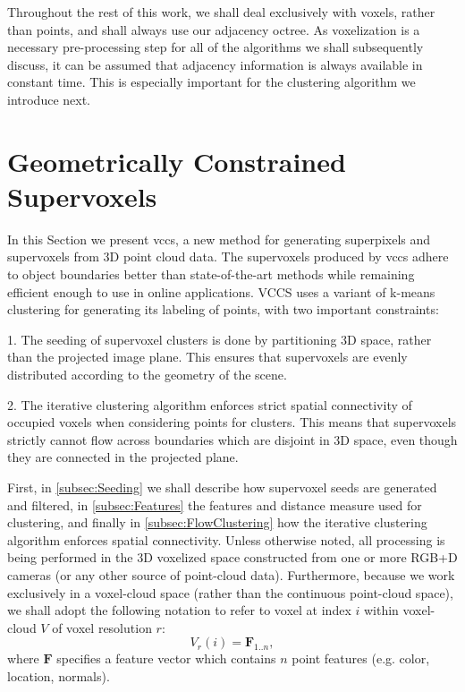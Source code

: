 Throughout the rest of this work, we shall deal exclusively with voxels, rather than points, and shall always use our adjacency octree. As voxelization is a necessary pre-processing step for all of the algorithms we shall subsequently discuss, it can be assumed that adjacency information is always available in constant time. This is especially important for the clustering algorithm we introduce next.

\section{Geometrically Constrained Supervoxels}
\label{sec:Supervoxels}
In this Section we present  \acrfull{vccs}, a new method for generating superpixels and supervoxels from 3D point cloud data. The supervoxels produced by \gls{vccs} adhere to object boundaries better than state-of-the-art methods while remaining efficient enough to use in online applications. VCCS uses a variant of k-means clustering for generating its labeling of points, with two important constraints:

1. The seeding of supervoxel clusters is done by partitioning 3D space, rather than the projected image plane. This ensures that supervoxels are evenly distributed according to the geometry of the scene.

2. The iterative clustering algorithm enforces strict spatial connectivity of occupied voxels when considering points for clusters. This means that supervoxels strictly cannot flow across boundaries which are disjoint in 3D space, even though they are connected in the projected plane.
 
First, in \ref{subsec:Seeding} we shall describe how supervoxel seeds are generated and filtered, in \ref{subsec:Features} the features and distance measure used for clustering, and finally in \ref{subsec:FlowClustering} how the iterative clustering algorithm enforces spatial connectivity. Unless otherwise noted, all processing is being performed in the 3D voxelized space constructed from one or more RGB+D cameras (or any other source of point-cloud data). Furthermore, because we work exclusively in a voxel-cloud space (rather than the continuous point-cloud space), we shall adopt the following notation to refer to voxel at index $i$ within voxel-cloud $V$ of voxel resolution $r$:
\begin{equation} \label{eqn:Voxel}
{V}_{r}(i) = \mathbf{F}_{1..n}, 
\end{equation}
where $\mathbf{F}$ specifies a feature vector which contains $n$ point features (e.g. color, location, normals). 

